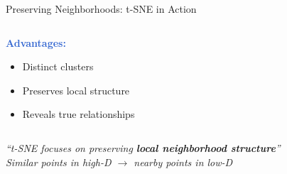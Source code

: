 \documentclass{beamer}
\begin{document}
\begin{frame}{Preserving Neighborhoods: t-SNE in Action}
\begin{columns}[T]
\begin{column}{0.48\textwidth}
\begin{center}
\end{center}

\footnotesize
\textcolor{highlight}{\textbf{Advantages:}}
\begin{itemize}
    \tiny
    \item Distinct clusters
    \item Preserves local structure
    \item Reveals true relationships
\end{itemize}
\end{column}
\end{columns}

\vspace{0.15cm}
\begin{center}
\colorbox{upcblue!10}{
\begin{minipage}{0.8\textwidth}
\centering
\footnotesize\textit{``t-SNE focuses on preserving \textbf{local neighborhood structure}''}\\
\footnotesize\textit{Similar points in high-D $\rightarrow$ nearby points in low-D}
\end{minipage}
}
\end{center}
\end{frame}
\end{document}
